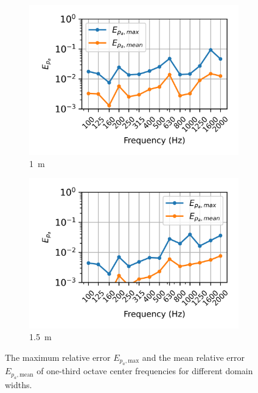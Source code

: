 {\begin{figure}
	\begin{subfigure}[b]{0.48\textwidth}
		\centering
		\includegraphics{fig/chap4/simulation_domain/width_1m.png}
		\caption{\SI{1}{\meter}}
	\end{subfigure}
	\hfill
	\begin{subfigure}[b]{0.48\textwidth}
		\centering
		\includegraphics{fig/chap4/simulation_domain/width_1pt5m.png}
		\caption{\SI{1.5}{\meter}}
	\end{subfigure}
	\caption{The maximum relative error $E_{p_a,\text{max}}$ and the mean relative error $E_{p_a,\text{mean}}$ of one-third octave center frequencies for different domain widths.}
	\label{fig:relative_error_spectrum}
\end{figure}

}

